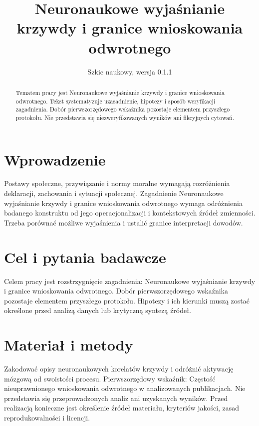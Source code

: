 \documentclass[11pt,a4paper]{article}
\title{Neuronaukowe wyjaśnianie krzywdy i granice wnioskowania odwrotnego}
\author{}
\date{Szkic naukowy, wersja 0.1.1}
\begin{document}
\maketitle

\begin{abstract}

Tematem pracy jest Neuronaukowe wyjaśnianie krzywdy i granice wnioskowania odwrotnego. Tekst systematyzuje uzasadnienie, hipotezy i sposób weryfikacji zagadnienia. Dobór pierwszorzędowego wskaźnika pozostaje elementem przyszłego protokołu. Nie przedstawia się niezweryfikowanych wyników ani fikcyjnych cytowań.

\end{abstract}

\section{Wprowadzenie}

Postawy społeczne, przywiązanie i normy moralne wymagają rozróżnienia deklaracji, zachowania i sytuacji społecznej. Zagadnienie Neuronaukowe wyjaśnianie krzywdy i granice wnioskowania odwrotnego wymaga odróżnienia badanego konstruktu od jego operacjonalizacji i kontekstowych źródeł zmienności. Trzeba porównać możliwe wyjaśnienia i ustalić granice interpretacji dowodów.

\section{Cel i pytania badawcze}

Celem pracy jest rozstrzygnięcie zagadnienia: Neuronaukowe wyjaśnianie krzywdy i granice wnioskowania odwrotnego. Dobór pierwszorzędowego wskaźnika pozostaje elementem przyszłego protokołu. Hipotezy i ich kierunki muszą zostać określone przed analizą danych lub krytyczną syntezą źródeł.

\section{Materiał i metody}

Zakodować opisy neuronaukowych korelatów krzywdy i odróżnić aktywację mózgową od swoistości procesu. Pierwszorzędowy wskaźnik: Częstość nieuprawnionego wnioskowania odwrotnego w analizowanych publikacjach. Nie przedstawia się przeprowadzonych analiz ani uzyskanych wyników. Przed realizacją konieczne jest określenie źródeł materiału, kryteriów jakości, zasad reprodukowalności i licencji.
\end{document}
